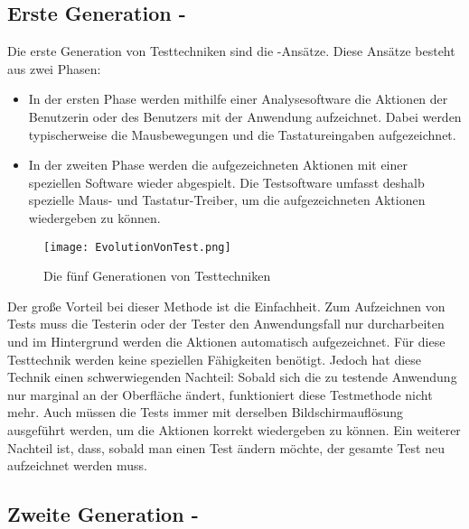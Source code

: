 \subsection{Erste Generation - }

Die erste Generation von Testtechniken sind die -Ansätze. Diese Ansätze besteht aus zwei Phasen: \\

\begin{itemize}

\item In der ersten Phase werden mithilfe einer Analysesoftware die Aktionen der Benutzerin oder des Benutzers mit der Anwendung aufzeichnet. Dabei werden typischerweise die Mausbewegungen und die Tastatureingaben aufgezeichnet.\\

\item In der zweiten Phase werden die aufgezeichneten Aktionen mit einer speziellen Software wieder abgespielt. Die Testsoftware umfasst deshalb spezielle Maus- und Tastatur-Treiber, um die aufgezeichneten Aktionen wiedergeben zu können.\\

\end{itemize}

\begin{figure}[h]
\centering
\texttt{[image: EvolutionVonTest.png]}
\caption{Die fünf Generationen von Testtechniken}
\label{fig:testEvolution}
\end{figure}


\SuperPar
Der große Vorteil bei dieser Methode ist die Einfachheit. Zum Aufzeichnen von Tests muss die Testerin oder der Tester den Anwendungsfall nur durcharbeiten und im Hintergrund werden die Aktionen automatisch aufgezeichnet. Für diese Testtechnik werden keine speziellen Fähigkeiten benötigt. Jedoch hat diese Technik einen schwerwiegenden Nachteil: Sobald sich die zu testende Anwendung nur marginal an der Oberfläche ändert, funktioniert diese Testmethode nicht mehr. Auch müssen die Tests immer mit derselben Bildschirmauflösung ausgeführt werden, um die Aktionen korrekt wiedergeben zu können. Ein weiterer Nachteil ist, dass, sobald man einen Test ändern möchte, der gesamte Test neu aufzeichnet werden muss.

\subsection{Zweite Generation - }

